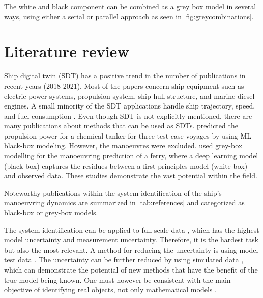 \vspace{5pt}

\noindent The white and black component can be combined as a grey box model in several ways, using either a serial or parallel approach \cite{leifsson_grey-box_2008} as seen in \autoref{fig:greycombinations}. 



\section{Literature review}
Ship digital twin (SDT) has a positive trend in the number of publications in recent years (2018-2021). Most of the papers concern ship equipment such as electric power systems, propulsion system, ship hull structure, and marine diesel engines. A small minority of the SDT applications handle ship trajectory, speed, and fuel consumption \cite{assani_ships_2022}.   
Even though SDT is not explicitly mentioned, there are many publications about methods that can be used as SDTs. \textcite{lang_comparison_2022} predicted the propulsion power for a chemical tanker for three test case voyages by using ML black-box modeling. However, the manoeuvres were excluded. \textcite{nielsen_machine_2022} used grey-box modelling for the manoeuvring prediction of a ferry, where a deep learning model (black-box) captures the residues between a first-principles model (white-box) and observed data. These studies demonstrate the vast potential within the field.

Noteworthy publications within the system identification of the ship's manoeuvring dynamics are summarized in \autoref{tab:references} and categorized as black-box or grey-box models.
 
The system identification can be applied to full scale data \cite{astrom_identification_1976,revestido_herrero_two-step_2012,perera_system_2015}, which has the highest model uncertainty and measurement uncertainty. Therefore, it is the hardest task but also the most relevant. A method for reducing the uncertainty is using model test data \cite{araki_estimating_2012,luo_parameter_2016,xue_identification_2021,miller_ship_2021, he_nonparametric_2022}. The uncertainty can be further reduced by using simulated data \cite{shi_identification_2009,zhu_parameter_2017,wang_parameter_2021}, which can demonstrate the potential of new methods that have the benefit of the true model being known. One must however be consistent with the main objective of identifying real objects, not only mathematical models \cite{miller_ship_2021}.

